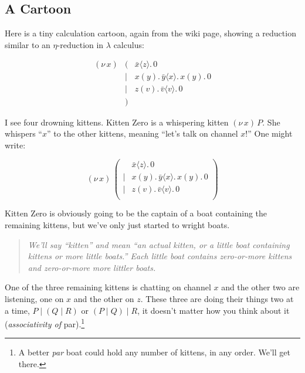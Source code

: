 \documentclass[10pt,oneside,x11names]{article}
\newcommand\napping    [0]{0}
\newcommand\chatting   [3]{\bar{#1}\langle{#2}\rangle{}.\,#3}
\newcommand\listening  [3]{#1(#2).\,#3}
\newcommand\two        [2]{#1\mathrel{\vert}{#2}}
\newcommand\whispering [2]{(\nu\,#1)\,{#2}}
\newcommand{\kitOne}{\chatting{x}{z}{\napping}}
\newcommand{\kitTwo}{\listening{x}{y}{\chatting{y}{x}{\listening{x}{y}{\napping}}}}
\newcommand{\kitThree}{\listening{z}{v}{\chatting{v}{v}{\napping}}}
\newcommand{\wkit}{\whispering{x}{P}}
\theoremstyle{definition}
\theoremstyle{warning}
\begin{document}
\subsection{A Cartoon}
\label{sec:org748ab25}

Here is a tiny calculation cartoon, again from the wiki page,
showing a reduction similar to an \(\eta\)\nobreakdash-reduction in
\(\lambda\) calculus:

\begin{equation}
\begin{array}{clll}
  (\nu\,x) & (      & \kitOne \\
           & \vert  & \kitTwo \\
           & \vert  & \kitThree \\
       {}  & )
\end{array}
\end{equation}

I see four drowning kittens. Kitten Zero is a whispering
kitten \(\wkit\). She whispers ``\(x\)'' to the other kittens,
meaning ``let's talk on channel \(x\)!'' One might write:

\begin{equation}
\whispering{x}{\left(
\begin{array}{clll}
 {}     & \kitOne \\
 \vert  & \kitTwo \\
 \vert  & \kitThree \\
\end{array}\right)}
\end{equation}

Kitten Zero is obviously going to be the captain of a boat
containing the remaining kittens, but we've only just started to
wright boats.

\begin{quote}
\emph{We'll say ``kitten'' and mean ``an actual kitten, or a little boat
containing kittens or more little boats.'' Each little boat contains zero-or-more kittens and zero-or-more more littler boats.}
\end{quote}

One of the three remaining kittens is chatting on channel \(x\) and
the other two are listening, one on \(x\) and the other on \(z\).
These three are doing their things two at a time,
\(\two{P}{(\two{Q}{R})}\) or \(\two{(\two{P}{Q})}{R}\), it doesn't
matter how you think about it (\emph{associativity of} par).\footnote{A
better \emph{par} boat could hold any number of kittens, in any order.
We'll get there.}
\end{document}
